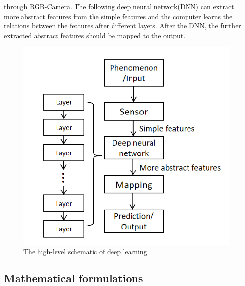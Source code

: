     through RGB-Camera. The following deep neural network(DNN) can extract more abstract features from the simple features and the computer learns the relations between 
    the features after different layers. After the DNN, the further extracted abstract features should be mapped to the output.  
    \begin{figure}
      \centering
      \includegraphics[width=0.6\linewidth]{example_images/DeepLearningSchematic}
      \caption{The high-level schematic of deep learning}
      \label{The high-level schematic of deep learning}
    \end{figure}
  \subsection{Mathematical formulations}
